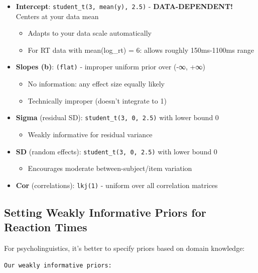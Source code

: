 \documentclass[
  11pt,
]{article}
\providecommand{\tightlist}{%
  \setlength{\itemsep}{0pt}\setlength{\parskip}{0pt}}
\begin{document}
\begin{itemize}
\tightlist
\item
  \textbf{Intercept}: \texttt{student\_t(3,\ mean(y),\ 2.5)} -
  \textbf{DATA-DEPENDENT!} Centers at your data mean

  \begin{itemize}
  \tightlist
  \item
    Adapts to your data scale automatically
  \item
    For RT data with mean(log\_rt) = 6: allows roughly 150ms-1100ms
    range
  \end{itemize}
\item
  \textbf{Slopes (b)}: \texttt{(flat)} - improper uniform prior over
  (-∞, +∞)

  \begin{itemize}
  \tightlist
  \item
    No information: any effect size equally likely
  \item
    Technically improper (doesn't integrate to 1)
  \end{itemize}
\item
  \textbf{Sigma} (residual SD): \texttt{student\_t(3,\ 0,\ 2.5)} with
  lower bound 0

  \begin{itemize}
  \tightlist
  \item
    Weakly informative for residual variance
  \end{itemize}
\item
  \textbf{SD} (random effects): \texttt{student\_t(3,\ 0,\ 2.5)} with
  lower bound 0

  \begin{itemize}
  \tightlist
  \item
    Encourages moderate between-subject/item variation
  \end{itemize}
\item
  \textbf{Cor} (correlations): \texttt{lkj(1)} - uniform over all
  correlation matrices
\end{itemize}

\subsection{Setting Weakly Informative Priors for Reaction
Times}\label{setting-weakly-informative-priors-for-reaction-times}

For psycholinguistics, it's better to specify priors based on domain
knowledge:

\begin{verbatim}
Our weakly informative priors:
\end{verbatim}
\end{document}
